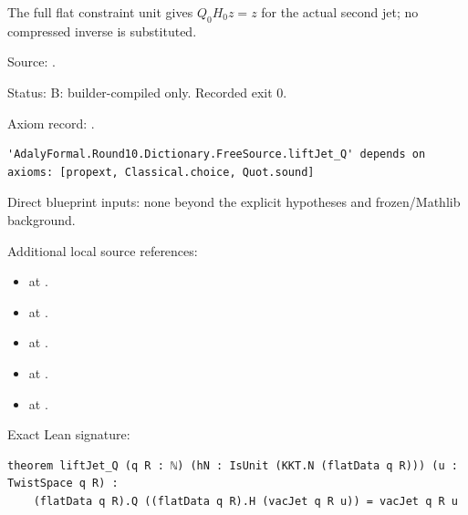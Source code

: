 \begin{theorem}[bp-147]
\label{bp-147}
\uses{}
\leanok
The full flat constraint unit gives \(Q_0H_0z=z\) for the actual second jet; no compressed inverse is substituted.

\par Source: \texttt{}.
\par Status: B: builder-compiled only. Recorded exit 0.
\par Axiom record: \texttt{}.
\begin{verbatim}
'AdalyFormal.Round10.Dictionary.FreeSource.liftJet_Q' depends on axioms: [propext, Classical.choice, Quot.sound]
\end{verbatim}
\par Direct blueprint inputs: none beyond the explicit hypotheses and frozen/Mathlib background.
\par Additional local source references:
\begin{itemize}
\item \texttt{} at \texttt{}.
\item \texttt{} at \texttt{}.
\item \texttt{} at \texttt{}.
\item \texttt{} at \texttt{}.
\item \texttt{} at \texttt{}.
\end{itemize}
\par Exact Lean signature:
\begin{verbatim}
theorem liftJet_Q (q R : ℕ) (hN : IsUnit (KKT.N (flatData q R))) (u : TwistSpace q R) :
    (flatData q R).Q ((flatData q R).H (vacJet q R u)) = vacJet q R u
\end{verbatim}
\end{theorem}

